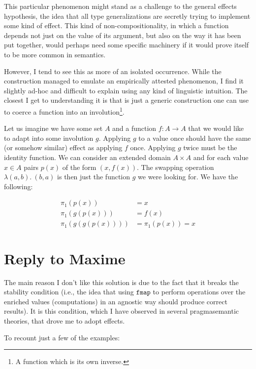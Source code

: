 \documentclass[a4paper,11pt,DIV=12]{scrartcl}
\begin{document}
This particular phenomenon might stand as a challenge to the general
effects hypothesis, the idea that all type generalizations are secretly
trying to implement some kind of effect. This kind of non-compositionality,
in which a function depends not just on the value of its argument, but also
on the way it has been put together, would perhaps need some specific
machinery if it would prove itself to be more common in semantics.

However, I tend to see this as more of an isolated occurrence. While the
construction managed to emulate an empirically attested phenomenon, I find
it slightly ad-hoc and difficult to explain using any kind of linguistic
intuition. The closest I get to understanding it is that is just a generic
construction one can use to coerce a function into an involution\footnote{A
  function which is its own inverse.}.

Let us imagine we have some set $A$ and a function $f : A \to A$ that we
would like to adapt into some involution $g$. Applying $g$ to a value once
should have the same (or somehow similar) effect as applying $f$
once. Applying $g$ twice must be the identity function. We can consider an
extended domain $A \times A$ and for each value $x \in A$ pairs $p(x)$ of
the form $(x, f(x))$. The swapping operation $\lambda (a, b).\ (b, a)$ is
then just the function $g$ we were looking for. We have the following:

\begin{align*}
\pi_1(p(x)) &= x \\
\pi_1(g(p(x))) &= f(x) \\
\pi_1(g(g(p(x)))) &= \pi_1(p(x)) = x
\end{align*}




\appendix

\section{Reply to Maxime}

The main reason I don't like this solution is due to the fact that it
breaks the stability condition (i.e., the idea that using $\texttt{fmap}$
to perform operations over the enriched values (computations) in an
agnostic way should produce correct results). It is this condition, which I
have observed in several pragmasemantic theories, that drove me to adopt
effects.

To recount just a few of the examples:
\end{document}
